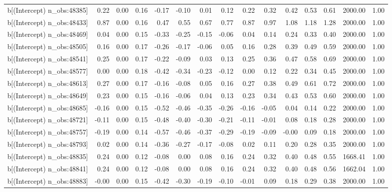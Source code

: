 \begin{table}[ht]
\begin{tabular}{rrrrrrrrrrrrrrr}
  b[(Intercept) n\_obs:48385] & 0.22 & 0.00 & 0.16 & -0.17 & -0.10 & 0.01 & 0.12 & 0.22 & 0.32 & 0.42 & 0.53 & 0.61 & 2000.00 & 1.00 \\ 
  b[(Intercept) n\_obs:48433] & 0.87 & 0.00 & 0.16 & 0.47 & 0.55 & 0.67 & 0.77 & 0.87 & 0.97 & 1.08 & 1.18 & 1.28 & 2000.00 & 1.00 \\ 
  b[(Intercept) n\_obs:48469] & 0.04 & 0.00 & 0.15 & -0.33 & -0.25 & -0.15 & -0.06 & 0.04 & 0.14 & 0.24 & 0.33 & 0.40 & 2000.00 & 1.00 \\ 
  b[(Intercept) n\_obs:48505] & 0.16 & 0.00 & 0.17 & -0.26 & -0.17 & -0.06 & 0.05 & 0.16 & 0.28 & 0.39 & 0.49 & 0.59 & 2000.00 & 1.00 \\ 
  b[(Intercept) n\_obs:48541] & 0.25 & 0.00 & 0.17 & -0.22 & -0.09 & 0.03 & 0.13 & 0.25 & 0.36 & 0.47 & 0.58 & 0.69 & 2000.00 & 1.00 \\ 
  b[(Intercept) n\_obs:48577] & 0.00 & 0.00 & 0.18 & -0.42 & -0.34 & -0.23 & -0.12 & 0.00 & 0.12 & 0.22 & 0.34 & 0.45 & 2000.00 & 1.00 \\ 
  b[(Intercept) n\_obs:48613] & 0.27 & 0.00 & 0.17 & -0.16 & -0.08 & 0.05 & 0.16 & 0.27 & 0.38 & 0.49 & 0.61 & 0.72 & 2000.00 & 1.00 \\ 
  b[(Intercept) n\_obs:48649] & 0.23 & 0.00 & 0.15 & -0.16 & -0.06 & 0.04 & 0.13 & 0.23 & 0.34 & 0.43 & 0.53 & 0.60 & 2000.00 & 1.00 \\ 
  b[(Intercept) n\_obs:48685] & -0.16 & 0.00 & 0.15 & -0.52 & -0.46 & -0.35 & -0.26 & -0.16 & -0.05 & 0.04 & 0.14 & 0.22 & 2000.00 & 1.00 \\ 
  b[(Intercept) n\_obs:48721] & -0.11 & 0.00 & 0.15 & -0.48 & -0.40 & -0.30 & -0.21 & -0.11 & -0.01 & 0.08 & 0.18 & 0.28 & 2000.00 & 1.00 \\ 
  b[(Intercept) n\_obs:48757] & -0.19 & 0.00 & 0.14 & -0.57 & -0.46 & -0.37 & -0.29 & -0.19 & -0.09 & -0.00 & 0.09 & 0.18 & 2000.00 & 1.00 \\ 
  b[(Intercept) n\_obs:48793] & 0.02 & 0.00 & 0.14 & -0.36 & -0.27 & -0.17 & -0.08 & 0.02 & 0.11 & 0.20 & 0.28 & 0.35 & 2000.00 & 1.00 \\ 
  b[(Intercept) n\_obs:48835] & 0.24 & 0.00 & 0.12 & -0.08 & 0.00 & 0.08 & 0.16 & 0.24 & 0.32 & 0.40 & 0.48 & 0.55 & 1668.41 & 1.00 \\ 
  b[(Intercept) n\_obs:48841] & 0.24 & 0.00 & 0.12 & -0.08 & 0.00 & 0.08 & 0.16 & 0.24 & 0.32 & 0.40 & 0.48 & 0.56 & 1662.04 & 1.00 \\ 
  b[(Intercept) n\_obs:48883] & -0.00 & 0.00 & 0.15 & -0.42 & -0.30 & -0.19 & -0.10 & -0.01 & 0.09 & 0.18 & 0.29 & 0.38 & 2000.00 & 1.00 \\ 

\end{tabular}
\end{table}

